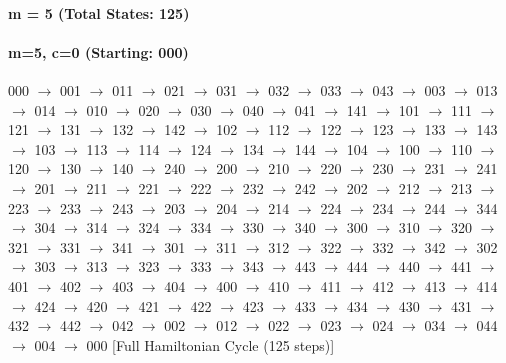 \paragraph{ m = 5 (Total States: 125)}


\paragraph{m=5, c=0 (Starting: 000)}


000 $\rightarrow$ 001 $\rightarrow$ 011 $\rightarrow$ 021 $\rightarrow$ 031 $\rightarrow$ 032 $\rightarrow$ 033 $\rightarrow$ 043 $\rightarrow$ 003 $\rightarrow$ 013 $\rightarrow$ 014 $\rightarrow$ 010 $\rightarrow$ 020 $\rightarrow$ 030 $\rightarrow$ 040 $\rightarrow$ 041 $\rightarrow$ 141 $\rightarrow$ 101 $\rightarrow$ 111 $\rightarrow$ 121 $\rightarrow$ 131 $\rightarrow$ 132 $\rightarrow$ 142 $\rightarrow$ 102 $\rightarrow$ 112 $\rightarrow$ 122 $\rightarrow$ 123 $\rightarrow$ 133 $\rightarrow$ 143 $\rightarrow$ 103 $\rightarrow$ 113 $\rightarrow$ 114 $\rightarrow$ 124 $\rightarrow$ 134 $\rightarrow$ 144 $\rightarrow$ 104 $\rightarrow$ 100 $\rightarrow$ 110 $\rightarrow$ 120 $\rightarrow$ 130 $\rightarrow$ 140 $\rightarrow$ 240 $\rightarrow$ 200 $\rightarrow$ 210 $\rightarrow$ 220 $\rightarrow$ 230 $\rightarrow$ 231 $\rightarrow$ 241 $\rightarrow$ 201 $\rightarrow$ 211 $\rightarrow$ 221 $\rightarrow$ 222 $\rightarrow$ 232 $\rightarrow$ 242 $\rightarrow$ 202 $\rightarrow$ 212 $\rightarrow$ 213 $\rightarrow$ 223 $\rightarrow$ 233 $\rightarrow$ 243 $\rightarrow$ 203 $\rightarrow$ 204 $\rightarrow$ 214 $\rightarrow$ 224 $\rightarrow$ 234 $\rightarrow$ 244 $\rightarrow$ 344 $\rightarrow$ 304 $\rightarrow$ 314 $\rightarrow$ 324 $\rightarrow$ 334 $\rightarrow$ 330 $\rightarrow$ 340 $\rightarrow$ 300 $\rightarrow$ 310 $\rightarrow$ 320 $\rightarrow$ 321 $\rightarrow$ 331 $\rightarrow$ 341 $\rightarrow$ 301 $\rightarrow$ 311 $\rightarrow$ 312 $\rightarrow$ 322 $\rightarrow$ 332 $\rightarrow$ 342 $\rightarrow$ 302 $\rightarrow$ 303 $\rightarrow$ 313 $\rightarrow$ 323 $\rightarrow$ 333 $\rightarrow$ 343 $\rightarrow$ 443 $\rightarrow$ 444 $\rightarrow$ 440 $\rightarrow$ 441 $\rightarrow$ 401 $\rightarrow$ 402 $\rightarrow$ 403 $\rightarrow$ 404 $\rightarrow$ 400 $\rightarrow$ 410 $\rightarrow$ 411 $\rightarrow$ 412 $\rightarrow$ 413 $\rightarrow$ 414 $\rightarrow$ 424 $\rightarrow$ 420 $\rightarrow$ 421 $\rightarrow$ 422 $\rightarrow$ 423 $\rightarrow$ 433 $\rightarrow$ 434 $\rightarrow$ 430 $\rightarrow$ 431 $\rightarrow$ 432 $\rightarrow$ 442 $\rightarrow$ 042 $\rightarrow$ 002 $\rightarrow$ 012 $\rightarrow$ 022 $\rightarrow$ 023 $\rightarrow$ 024 $\rightarrow$ 034 $\rightarrow$ 044 $\rightarrow$ 004 $\rightarrow$ 000 [Full Hamiltonian Cycle (125 steps)]

